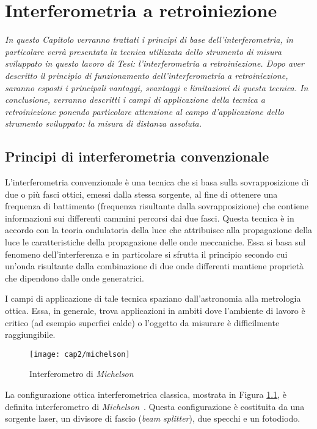 \chapter{Interferometria a retroiniezione}
\label{capitolo2}
\thispagestyle{empty}

\textit{In questo Capitolo verranno trattati i principi di base dell'interferometria, in particolare verrà presentata la tecnica utilizzata dello strumento di misura sviluppato in questo lavoro di Tesi: l'interferometria a retroiniezione. Dopo aver descritto il principio di funzionamento dell'interferometria a retroiniezione, saranno esposti i principali vantaggi, svantaggi e limitazioni di questa tecnica. In conclusione, verranno descritti i campi di applicazione della tecnica a retroiniezione ponendo particolare attenzione al campo d'applicazione dello strumento sviluppato: la misura di distanza assoluta.}

\section{Principi di interferometria convenzionale}
L'interferometria convenzionale è una tecnica che si basa sulla sovrapposizione di due o più fasci ottici, emessi dalla stessa sorgente, al fine di ottenere una frequenza di battimento (frequenza risultante dalla sovrapposizione) che contiene informazioni sui differenti cammini percorsi dai due fasci. Questa tecnica è in accordo con la teoria ondulatoria della luce che attribuisce alla propagazione della luce le caratteristiche della propagazione delle onde meccaniche. Essa si basa sul fenomeno dell'interferenza e in particolare si sfrutta il principio secondo cui un'onda risultante dalla combinazione di due onde differenti mantiene proprietà che dipendono dalle onde generatrici.

I campi di applicazione di tale tecnica spaziano dall'astronomia alla metrologia ottica. Essa, in generale, trova applicazioni in ambiti dove l'ambiente di lavoro è critico (ad esempio superfici calde) o l'oggetto da misurare è difficilmente raggiungibile.
\begin{figure}[H] 
  \begin{center}
    \texttt{[image: cap2/michelson]}
    \caption{Interferometro di \textit{Michelson}}
    \label{michelson}
  \end{center}
\end{figure}
La configurazione ottica interferometrica classica, mostrata in Figura \ref{michelson}, è definita interferometro di \textit{Michelson}~\cite{sensmeslaser}. Questa configurazione è costituita da una sorgente laser, un divisore di fascio (\textit{beam splitter}), due specchi e un fotodiodo.


